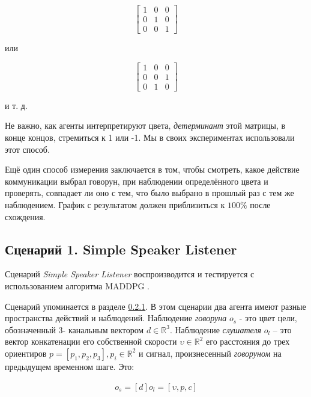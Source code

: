 \begin{equation*}
    \begin{bmatrix}
        1 & 0 & 0 \\
        0 & 1 & 0 \\
        0 & 0 & 1
    \end{bmatrix}
\end{equation*}

или

\begin{equation*}
    \begin{bmatrix}
        1 & 0 & 0 \\
        0 & 0 & 1 \\
        0 & 1 & 0
    \end{bmatrix}
\end{equation*}

и т. д.

Не важно, как агенты интерпретируют цвета, \textit{детерминант} этой матрицы, в конце концов, стремиться к 1 или -1. Мы в своих экспериментах использовали этот способ.

Ещё один способ измерения заключается в том, чтобы смотреть, какое действие коммуникации выбрал говорун, при наблюдении определённого цвета и проверять, совпадает ли оно с тем, что было выбрано в прошлый раз с тем же наблюдением. График с результатом должен приблизиться к $100\%$ после схождения.

\subsection{Сценарий 1. Simple Speaker Listener}  \label{ch4:exp-ssl}

Сценарий \textit{Simple Speaker Listener} воспроизводится и тестируется с использованием алгоритма MADDPG \cite{lowe2017multiagent}.

Сценарий упоминается в разделе \hyperref[intro:ssl]{0.2.1}. В этом сценарии два агента имеют разные пространства действий и наблюдений. Наблюдение \textit{говоруна} $o_s$ - это цвет цели, обозначенный 3- канальным вектором $d \in \mathbb{R}^3$. Наблюдение \textit{слушателя} $o_l$ – это вектор конкатенации его собственной скорости $\upsilon \in \mathbb{R}^2$ его расстояния до трех ориентиров $p = [p_1, p_2, p_3], p_i \in \mathbb{R}^2$ и сигнал, произнесенный \textit{говоруном} на предыдущем временном шаге. Это:

\begin{equation}
    \begin{multlined}
        o_s = [d]
        o_l = [\upsilon, p, c]
    \end{multlined}
\end{equation}

